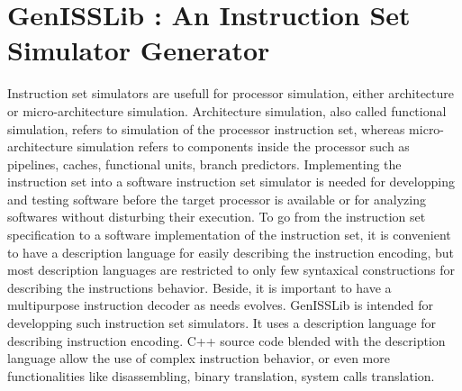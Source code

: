 \section{GenISSLib : An Instruction Set Simulator Generator}

Instruction set simulators are usefull for processor simulation, either
architecture or micro-architecture simulation. Architecture simulation,
also called functional simulation, refers to simulation of the processor
instruction set, whereas micro-architecture simulation refers to components
inside the processor such as pipelines, caches, functional units, branch
predictors. Implementing the instruction set into a software instruction set
simulator is needed for developping and testing software before the target
processor is available or for analyzing softwares without disturbing their execution.
To go from the instruction set specification to a software
implementation of the instruction set, it is convenient to have a description language
for easily describing the instruction encoding, but most description languages
are restricted to only few syntaxical constructions for describing the
instructions behavior. Beside, it is important to have a multipurpose instruction decoder as needs evolves.
GenISSLib is intended for developping such instruction set simulators. It uses a
description language for describing instruction encoding. C++ source code blended with
the description language allow the use of complex instruction behavior, or even more functionalities
like disassembling, binary translation, system calls translation.

